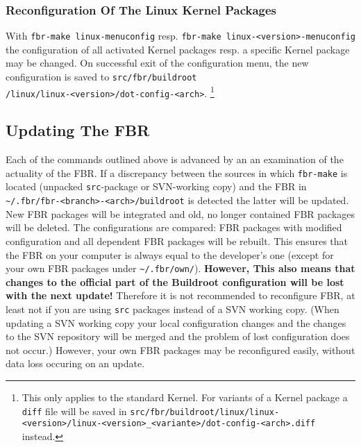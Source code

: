 
\subsubsection{Reconfiguration Of The Linux Kernel Packages}

With \texttt{fbr-make linux-menuconfig} resp. \texttt{fbr-make linux-<version>-menuconfig}
the configuration of all activated Kernel packages resp. a specific Kernel package
may be changed. On successful exit of the configuration menu,
the new configuration is saved to
\texttt{src/fbr/buildroot\\/linux/linux-<version>/dot-config-<arch>}.
\footnote{This only applies to the standard Kernel. For variants of a Kernel package
a \texttt{diff} file will be saved in
\texttt{src/fbr/buildroot/linux/linux-<version>/linux-<version>\_<variante>/dot-config-<arch>.diff}
instead.}


\subsection{Updating The FBR}

Each of the commands outlined above is advanced by an an examination
of the actuality of the FBR. If a discrepancy between the sources in which
\texttt{fbr-make} is located (unpacked \texttt{src}-package or SVN-working copy)
and the FBR in \texttt{\~{}/.fbr/fbr-<branch>-<arch>/buildroot} is detected
the latter will be updated. New FBR packages will be integrated and old, no
longer contained FBR packages will be deleted. The configurations are compared:
FBR packages with modified configuration and all dependent FBR packages will be
rebuilt. This ensures that the FBR on your computer is always equal to the developer's
one (except for your own FBR packages under \texttt{\~{}/.fbr/own/}).
\textbf{However, This also means that changes to the official part of the
Buildroot configuration will be lost with the next update!} Therefore
it is not recommended to reconfigure FBR, at least not if you are using
\texttt{src} packages instead of a SVN working copy. (When updating a SVN
working copy your local configuration changes and the changes to the SVN
repository will be merged and the problem of lost configuration does not occur.)
However, your own FBR packages may be reconfigured easily, without data loss
occuring on an update.


